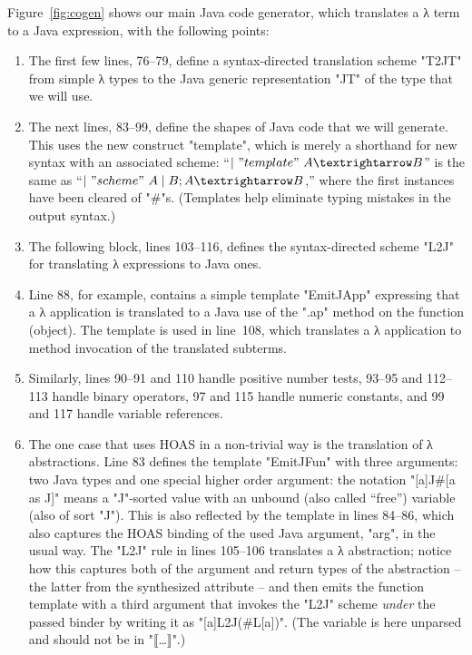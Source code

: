 \documentclass[letterpaper]{article}
\begin{document}
\begin{example}
  Figure~\ref{fig:cogen} shows our main Java code generator, which translates a λ term to a Java
  expression, with the following points:
  \begin{enumerate}

  \item The first few lines, 76--79, define a syntax-directed translation scheme "T2JT" from simple
    λ types to the Java generic representation "JT" of the type that we will use.

  \item The next lines, 83--99, define the shapes of Java code that we will generate. This uses the
    new construct "template", which is merely a shorthand for new syntax with an associated scheme:
    ``$|~"template"~A→B$'' is the same as ``$|~"scheme"~A \mid B ; A→B $,'' where the first
    instances have been cleared of "#"s. (Templates help eliminate typing mistakes in the output
    syntax.)

  \item The following block, lines 103--116, defines the syntax-directed scheme "L2J" for
    translating λ expressions to Java ones.

  \item Line 88, for example, contains a simple template "EmitJApp" expressing that a λ application
    is translated to a Java use of the ".ap" method on the function (object). The template is used
    in line~108, which translates a λ application to method invocation of the translated subterms.

  \item Similarly, lines 90--91 and 110 handle positive number tests, 93--95 and 112--113 handle
    binary operators, 97 and 115 handle numeric constants, and 99 and 117 handle variable
    references.

  \item The one case that uses HOAS in a non-trivial way is the translation of λ abstractions. Line
    83 defines the template "EmitJFun" with three arguments: two Java types and one special higher
    order argument: the notation "[a]J#[a as J]" means a "J"-sorted value with an unbound (also
    called ``free'') variable (also of sort "J"). This is also reflected by the template in lines
    84--86, which also captures the HOAS binding of the used Java argument, "arg", in the usual way.
    The "L2J" rule in lines 105--106 translates a λ abstraction; notice how this captures both of
    the argument and return types of the abstraction -- the latter from the synthesized attribute --
    and then emits the function template with a third argument that invokes the "L2J" scheme
    \emph{under} the passed binder by writing it as "[a]L2J(#L[a])". (The variable is here unparsed
    and should not be in "⟦…⟧".)


\end{enumerate}
\end{example}
\end{document}

